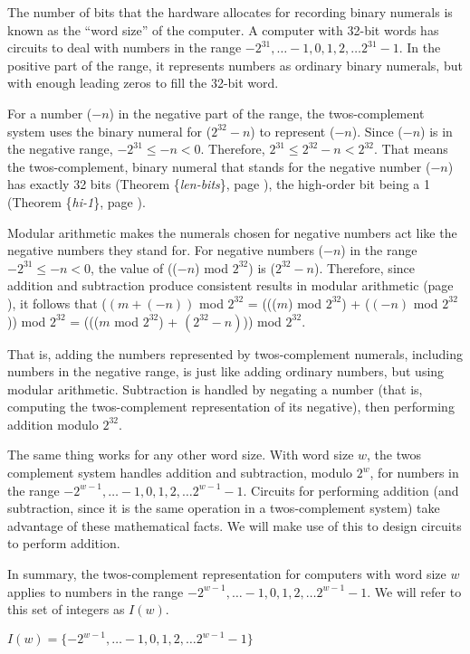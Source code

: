 The number of bits that the hardware allocates for recording binary numerals
is known as the ``word size'' of the computer.
A computer with 32-bit words has circuits to deal with numbers
in the range $-2^{31}, \dots -1, 0, 1, 2, \dots 2^{31}-1$.
In the positive part of the range, it represents numbers as
ordinary binary numerals, but with enough leading zeros
to fill the 32-bit word.

For a number ($-n$) in the negative part of the range,
the twos-complement system uses the binary numeral
for ($2^{32}-n$) to represent ($-n$).
Since ($-n$) is in the negative range,
$-2^{31} \le -n < 0$.
Therefore, $2^{31} \le 2^{32}-n < 2^{32}$.
That means the twos-complement, binary numeral
that stands for the negative number ($-n$)
has exactly 32 bits (Theorem \{\emph{len-bits}\}, page \pageref{len-bits}),
the high-order bit being a 1
(Theorem \{\emph{hi-1}\}, page \pageref{hi-1}).

Modular arithmetic makes the numerals chosen
for negative numbers act like the negative numbers they stand for.
For negative numbers ($-n$) in the range $-2^{31} \le -n < 0$,
the value of (($-n$) mod $2^{32}$) is ($2^{32}-n$).
Therefore, since addition and subtraction produce consistent
results in modular arithmetic (page \pageref{modular-arithmetic}),
it follows that
  ($(m+(-n))$ mod $2^{32}$
= ((($m$) mod $2^{32}$) + ($(-n)$ mod $2^{32}$)) mod $2^{32}$
= ((($m$ mod $2^{32}$) + $(2^{32} - n)$)) mod $2^{32}$.

That is, adding the numbers represented by twos-complement
numerals, including numbers in the negative range,
is just like adding ordinary numbers, but using modular arithmetic.
Subtraction is handled by negating a number
(that is, computing the twos-complement representation
of its negative), then performing addition modulo $2^{32}$.

The same thing works for any other word size.
With word size $w$, the twos complement system
handles addition and subtraction, modulo $2^w$, for numbers
in the range $-2^{w-1}, \dots -1, 0, 1, 2, \dots 2^{w-1}-1$.
Circuits for performing addition (and subtraction, since
it is the same operation in a twos-complement system)
take advantage of these mathematical facts.
We will make use of this to design circuits to perform addition.

In summary, the twos-complement representation for computers with
word size $w$ applies to numbers in the range
$-2^{w-1}, \dots -1, 0, 1, 2, \dots 2^{w-1}-1$.
We will refer to this set of integers as $I(w)$.
\label{def-Iw}
\begin{center}
$I(w) = \{-2^{w-1}, \dots -1, 0, 1, 2, \dots 2^{w-1}-1\}$
\end{center}

